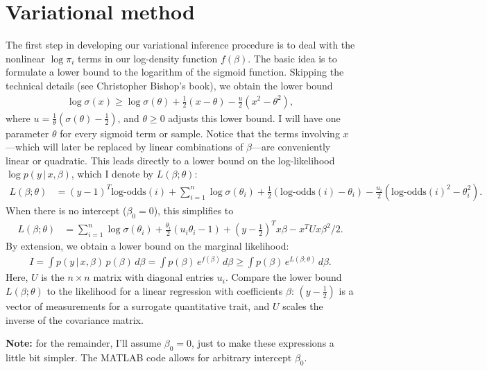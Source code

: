 \documentclass[final]{siamltex}
\newcommand{\smfrac}[2]{{\textstyle\frac{#1}{#2}}}
\newcommand{\half}{{\textstyle\frac{1}{2}}}
\newcommand{\smint}{\textstyle\int}
\newcommand{\logodds}{\mbox{log-odds}}
\begin{document}
\section*{Variational method}

The first step in developing our variational inference procedure is to
deal with the nonlinear $\log\pi_i$ terms in our log-density function
$f(\beta)$. The basic idea is to formulate a lower bound to the
logarithm of the sigmoid function. Skipping the technical details (see
Christopher Bishop's book), we obtain the lower bound
\begin{align*}
\log\sigma(x) \geq 
\log\sigma(\theta) + \half(x-\theta) - \smfrac{u}{2}(x^2-\theta^2),
\end{align*}
where $u = \frac{1}{\theta}(\sigma(\theta) - \half)$, and $\theta \geq
0$ adjusts this lower bound. I will have one parameter $\theta$ for
every sigmoid term or sample. Notice that the terms involving
$x$---which will later be replaced by linear combinations of
$\beta$---are conveniently linear or quadratic. This leads directly to
a lower bound on the log-likelihood $\log p(y \,|\, x, \beta)$, which
I denote by $L(\beta; \theta)$:
\begin{align*}
L(\beta; \theta) &= 
(y-1)^T\logodds(i) + \sum_{i=1}^n \log\sigma(\theta_i) 
+ \half(\logodds(i) - \theta_i) 
- \smfrac{u_i}{2}(\logodds(i)^2 - \theta_i^2).
\end{align*}
When there is no intercept ($\beta_0 = 0$), this simplifies to
\begin{align*}
L(\beta; \theta) &= \sum_{i=1}^n \log\sigma(\theta_i) +
\smfrac{\theta_i}{2}(u_i\theta_i - 1)
+ (y-\half)^Tx\beta - x^TUx\beta^2/2.
\end{align*}
By extension, we obtain a lower bound on the marginal likelihood:
\begin{align*}
I 
= \smint p(y \,|\, x, \beta) \, p(\beta) \, d\beta 
= \smint p(\beta) \, e^{f(\beta)} \, d\beta 
\geq \smint p(\beta) \, e^{L(\beta; \theta)} \, d\beta.
\end{align*}
Here, $U$ is the $n \times n$ matrix with diagonal entries $u_i$.
Compare the lower bound $L(\beta; \theta)$ to the likelihood for a
linear regression with coefficients $\beta$: $(y - \half)$ is a vector
of measurements for a surrogate quantitative trait, and $U$ scales the
inverse of the covariance matrix.

{\bf Note:} for the remainder, I'll assume $\beta_0 = 0$, just to make
these expressions a little bit simpler. The MATLAB code allows for
arbitrary intercept $\beta_0$.
\end{document}
